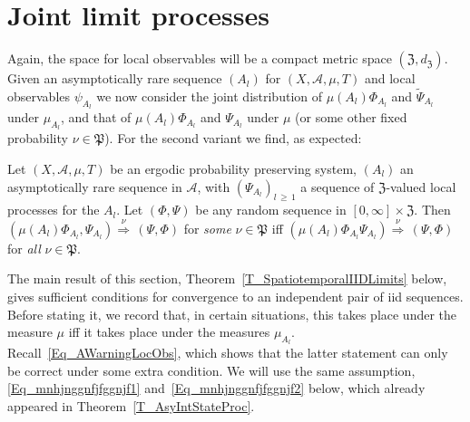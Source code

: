 \documentclass[10pt]{amsart}
\theoremstyle{definition}\newtheorem{defi}[theo]{Definition}\newtheorem{rema}[theo]{Remark}\newtheorem{exam}[theo]{Example}\newtheorem{exem}[theo]{Example}\newtheorem{nota}[theo]{Notation}
\newcommand{\clA}{\mathcal{A}}
\newcommand{\frkP}{\mathfrak{P}}
\newcommand{\frkZ}{\mathfrak{Z}}
\begin{document}
\section{Joint limit processes}

Again, the space for local observables will be a compact metric space $(\frkZ,d_{\frkZ})$. Given an asymptotically rare sequence $(A_{l})$ for $(X,\clA,\mu,T)$ and local observables $\psi_{A_{l}}$ we now consider the joint distribution of $\mu(A_{l})\Phi_{A_{l}}$ and $\widetilde{\Psi}_{A_{l}}$ under $\mu_{A_{l}}$, and that of $\mu(A_{l})\Phi_{A_{l}}$ and $\Psi_{A_{l}}$ under $\mu$ (or some other fixed probability $\nu\in\frkP$). For the second variant we find, as expected:

\begin{prop}\label{P_SDCJoint}
Let $(X,\clA,\mu,T)$ be an ergodic probability preserving system, $(A_{l})$ an asymptotically rare sequence in $\clA$, with $(\Psi_{A_{l}})_{l\,\geq\,1}$ a sequence of $\frkZ $-valued local processes for the $A_{l}$. Let $(\Phi,\Psi)$ be any random sequence in $[0,\infty]\times\frkZ$. Then $(\mu(A_{l})\Phi_{A_{l}},\Psi_{A_{l}})\overset{\nu}{\Longrightarrow}\,(\Psi,\Phi)$ for \emph{some} $\nu\in\frkP$ iff $(\mu(A_{l})\Phi_{A_{l}}\Psi_{A_{l}})\overset{\nu }{\Longrightarrow}\,(\Psi,\Phi)$ for \emph{all} $\nu\in\frkP$.
\end{prop}

The main result of this section, Theorem~\ref{T_SpatiotemporalIIDLimits} below, gives sufficient conditions for convergence to an independent pair of iid sequences. Before stating it, we record that, in certain situations, this takes place under the measure $\mu$ iff it takes place under the measures $\mu_{A_{l}}$. Recall~\eqref{Eq_AWarningLocObs}, which shows that the latter statement can only be correct under some extra condition. We will use the same assumption, \eqref{Eq_mnhjnggnfjfggnjf1} and~\eqref{Eq_mnhjnggnfjfggnjf2} below, which already appeared in Theorem~\ref{T_AsyIntStateProc}.
\end{document}
